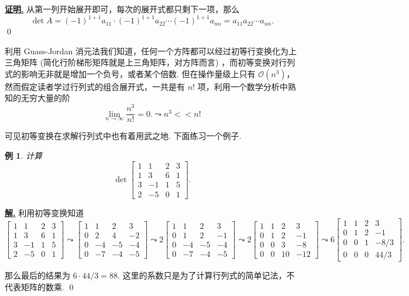 \documentclass[10pt,openany]{article}
\theoremstyle{thmstyle} %
\theoremstyle{defstyle} %
\theoremstyle{prostyle} %
\theoremstyle{exastyle}
\newtheorem{example}[theorem]{例}
\theoremstyle{remstyle}
\renewenvironment{proof}[1][证明]{\par\underline{\textbf{#1.}} \;\fangsong}{\qed\par}
\newenvironment{solution}{\par\underline{\textbf{解.}} \;\fangsong}{\qed\par}
\begin{document}
\begin{proof}
	从第一列开始展开即可，每次的展开式都只剩下一项，那么
	\[ \det A= (-1)^{1+1}a_{11} \cdot (-1)^{1+1}a_{22} \cdots (-1)^{1+1} a_{nn}=a_{11}a_{22}\cdots a_{nn}. \]
\end{proof}

利用 Guass-Jordan 消元法我们知道，任何一个方阵都可以经过初等行变换化为上三角矩阵 (简化行阶梯形矩阵就是上三角矩阵，对方阵而言) ，而初等变换对行列式的影响无非就是增加一个负号，或者某个倍数. 但在操作量级上只有 \( \mathcal{O}(n^3) \)，然而假定读者学过行列式的组合展开式，一共是有 \( n! \) 项，利用一个数学分析中熟知的无穷大量的阶
\[ \lim\limits_{n \to \infty} \frac{n^3}{n!}=0. \leadsto n^3<<n!  \]

可见初等变换在求解行列式中也有着用武之地. 下面练习一个例子.

\begin{example}
	计算 \[ \det \begin{bmatrix}
		1 & 1 & 2 & 3 \\
		1 & 3 & 6 & 1 \\
		3 & -1 & 1 & 5 \\
		2 & -5 & 0 & 1
	\end{bmatrix}. \]
\end{example}

\begin{solution}
	利用初等变换知道
	\[ \begin{bmatrix}
		1 & 1 & 2 & 3 \\
		1 & 3 & 6 & 1 \\
		3 & -1 & 1 & 5 \\
		2 & -5 & 0 & 1
	\end{bmatrix} \leadsto \begin{bmatrix}
	1 & 1 & 2 & 3 \\
	0 & 2 & 4 & -2 \\
	0 & -4 & -5 & -4 \\
	0 & -7 & -4 & -5
	\end{bmatrix} \leadsto 2 \begin{bmatrix}
	1 & 1 & 2 & 3 \\
	0 & 1 & 2 & -1 \\
	0 & -4 & -5 & -4 \\
	0 & -7 & -4 & -5
\end{bmatrix} \leadsto 2 \begin{bmatrix}
1 & 1 & 2 & 3 \\
0 & 1 & 2 & -1 \\
0 & 0 & 3 & -8 \\
0 & 0 & 10 & -12
\end{bmatrix} \leadsto 6 \begin{bmatrix}
1 & 1 & 2 & 3 \\
0 & 1 & 2 & -1 \\
0 & 0 & 1 & -8/3 \\
0 & 0 & 0 & 44/3
\end{bmatrix}.   \]

那么最后的结果为 \( 6 \cdot 44/3=88 \). 这里的系数只是为了计算行列式的简单记法，不代表矩阵的数乘.
\end{solution}
\end{document}
